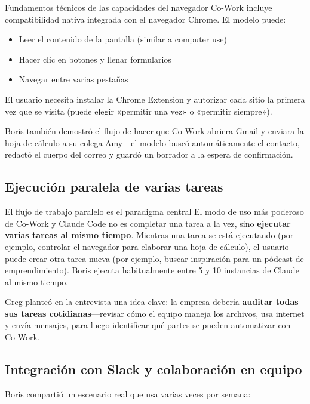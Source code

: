 \documentclass[a4paper]{article}
\begin{document}
\begin{knowledgebox}{Fundamentos técnicos de las capacidades del navegador}
Co-Work incluye compatibilidad nativa integrada con el navegador Chrome. El modelo puede:
\begin{itemize}
    \item Leer el contenido de la pantalla (similar a computer use)
    \item Hacer clic en botones y llenar formularios
    \item Navegar entre varias pestañas
\end{itemize}
El usuario necesita instalar la Chrome Extension y autorizar cada sitio la primera vez que se visita (puede elegir «permitir una vez» o «permitir siempre»).
\end{knowledgebox}

Boris también demostró el flujo de hacer que Co-Work abriera Gmail y enviara la hoja de cálculo a su colega Amy—el modelo buscó automáticamente el contacto, redactó el cuerpo del correo y guardó un borrador a la espera de confirmación.

\subsection{Ejecución paralela de varias tareas}

\begin{importantbox}{El flujo de trabajo paralelo es el paradigma central}
El modo de uso más poderoso de Co-Work y Claude Code no es completar una tarea a la vez, sino \textbf{ejecutar varias tareas al mismo tiempo}. Mientras una tarea se está ejecutando (por ejemplo, controlar el navegador para elaborar una hoja de cálculo), el usuario puede crear otra tarea nueva (por ejemplo, buscar inspiración para un pódcast de emprendimiento). Boris ejecuta habitualmente entre 5 y 10 instancias de Claude al mismo tiempo.
\end{importantbox}

Greg planteó en la entrevista una idea clave: la empresa debería \textbf{auditar todas sus tareas cotidianas}—revisar cómo el equipo maneja los archivos, usa internet y envía mensajes, para luego identificar qué partes se pueden automatizar con Co-Work.

\subsection{Integración con Slack y colaboración en equipo}

Boris compartió un escenario real que usa varias veces por semana:
\end{document}
